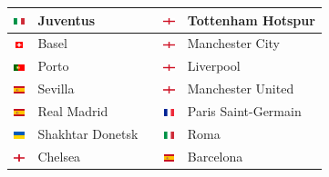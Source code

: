 \documentclass{../ficheTDTP}
\begin{document}
\begin{tabular}{|clccl|}
\hline
\includegraphics[height=0.2cm]{flags/it.png} & Juventus & & \includegraphics[height=0.2cm]{flags/en.png} & Tottenham Hotspur \\ \hline
\includegraphics[height=0.2cm]{flags/ch.png} & Basel & & \includegraphics[height=0.2cm]{flags/en.png} & Manchester City \\ \hline
\includegraphics[height=0.2cm]{flags/po.png} & Porto & & \includegraphics[height=0.2cm]{flags/en.png} & Liverpool \\ \hline
\includegraphics[height=0.2cm]{flags/es.png} & Sevilla & & \includegraphics[height=0.2cm]{flags/en.png} & Manchester United \\ \hline
\includegraphics[height=0.2cm]{flags/es.png} & Real Madrid & & \includegraphics[height=0.2cm]{flags/fr.png} & Paris Saint-Germain \\ \hline
\includegraphics[height=0.2cm]{flags/ua.png} & Shakhtar Donetsk & & \includegraphics[height=0.2cm]{flags/it.png} & Roma \\ \hline
\includegraphics[height=0.2cm]{flags/en.png} & Chelsea & & \includegraphics[height=0.2cm]{flags/es.png} & Barcelona \\ \hline

\end{tabular}
\end{document}
